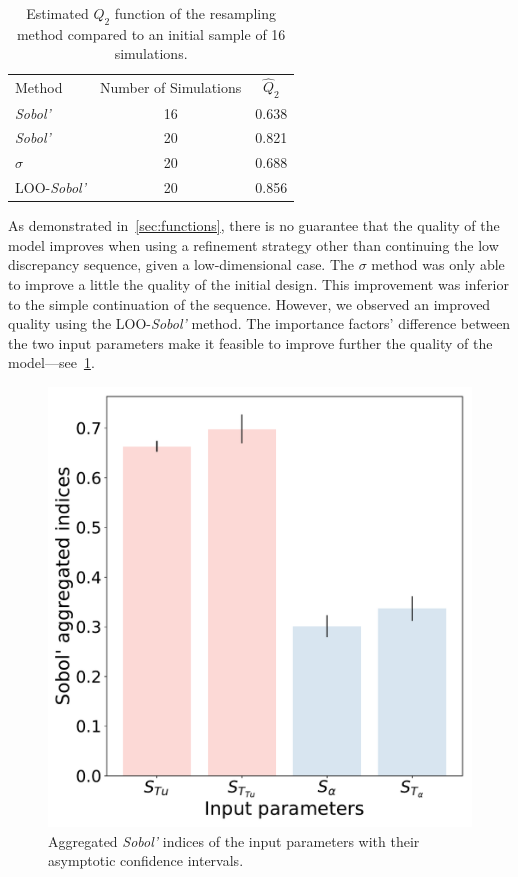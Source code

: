 \begin{table}[h]
\centering
\begin{tabular}{lcc}
\toprule
Method & Number of Simulations &$\hat{Q}_2$\\
\cmidrule{2-3}
\textit{Sobol'}&16 & 0.638\\
\textit{Sobol'}&20& 0.821\\
\textit{$\sigma$}&20& 0.688\\
LOO-\textit{Sobol'}&20& 0.856\\
\bottomrule
\end{tabular}
\caption{Estimated $Q_2$ function of the resampling method compared to an initial sample of 16 simulations.}
\label{tab:ls89-q2}
\end{table}

As demonstrated in~\cref{sec:functions}, there is no guarantee that the quality of the model improves when using a refinement strategy other than continuing the low discrepancy sequence, given a low-dimensional case. The $\sigma$ method was only able to improve a little the quality of the initial design. This improvement was inferior to the simple continuation of the sequence. However, we observed an improved quality using the LOO-\textit{Sobol'} method. The importance factors' difference between the two input parameters make it feasible to improve further the quality of the model---see~\cref{fig:ls89-aggregated}.

\begin{figure}[h]
\centering
\includegraphics[width=0.5\linewidth]{fig/applications/ls89/15_1column_color-online-only_aggregated_indices.pdf}
\caption{Aggregated \textit{Sobol'} indices of the input parameters with their asymptotic confidence intervals.}
\label{fig:ls89-aggregated}
\end{figure}

